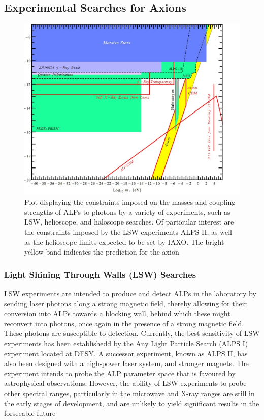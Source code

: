 \subsection{Experimental Searches for Axions}
\begin{figure}[H]
    \centering
    \includegraphics[scale = 0.45]{ALPExperimentalConstraints.jpg}
    \caption{Plot displaying the constraints imposed on the masses and coupling strengths of ALPs to photons by a variety of experiments, such as LSW, helioscope, and haloscope searches. Of particular interest are the constraints imposed by the LSW experiments ALPS-II, as well as the helioscope limits expected to be set by IAXO. The bright yellow band indicates
    the prediction for the axion}
    \label{ALPExperimentalConstraints}
\end{figure}
\subsubsection{Light Shining Through Walls (LSW) Searches}
LSW experiments are intended to produce and detect ALPs in the laboratory by sending laser photons along a strong magnetic field,
thereby allowing for their conversion into ALPs towards a blocking wall, behind which these might reconvert into photons, once again in the presence of 
a strong magnetic field. These photons are susceptible to detection. Currently, the best sensitivity of LSW experiments has been establishedd by the Any Light Particle Search
(ALPS I) experiment located at DESY. A successor experiment, known as ALPS II, has also been designed with a high-power laser system, and stronger magnets. The experiment intends to 
probe the ALP parameter space that is favoured by astrophysical observations. However, the ability of LSW experiments to probe other spectral ranges, particularly in the microwave and
X-ray ranges are still in the early stages of development, and are unlikely to yield significant results in the forseeable future
